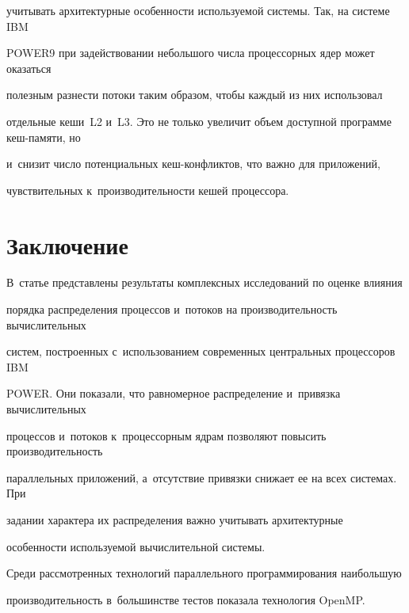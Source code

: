 учитывать архитектурные особенности ис\-поль\-зу\-емой сис\-те\-мы. Так, на системе IBM 


POWER9 при задействовании небольшого чис\-ла процессорных ядер может оказаться 


полезным разнести потоки таким образом, чтобы каж\-дый из них использовал 


отдельные кеши~L2 и~L3. Это не только увеличит объем доступной программе кеш-па\-мя\-ти, но 


и~снизит чис\-ло потенциальных кеш-кон\-флик\-тов, что важно для приложений, 


чувствительных к~про\-из\-во\-ди\-тель\-ности кешей процессора.








\section{Заключение} %





В~статье представлены результаты комплексных исследований по оценке влияния 


порядка распределения процессов и~потоков на производительность вычислительных 


систем, построенных с~использованием современных центральных процессоров IBM 


POWER. Они показали, что равномерное распределение и~привязка вычислительных 


процессов и~потоков к~процессорным ядрам поз\-во\-ля\-ют повысить производительность 


параллельных приложений, а~отсутствие привязки снижает ее на всех сис\-те\-мах. При 


задании характера их распределения важно учитывать архитектурные 


особенности используемой вычислительной сис\-темы.


{ %





}





Среди рассмотренных технологий параллельного программирования наибольшую 


производительность в~большинстве тестов показала технология \mbox{OpenMP}.





